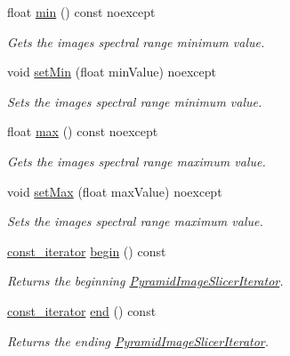 \begin{DoxyCompactItemize}
float \hyperlink{classdg_1_1deepcore_1_1imagery_1_1_pyramid_image_slicer_a80fbcced5b4df71aae2b04cc60373757}{min} () const noexcept
\begin{DoxyCompactList}\small\item\em Gets the image\textquotesingle{}s spectral range minimum value. \end{DoxyCompactList}\item 
void \hyperlink{classdg_1_1deepcore_1_1imagery_1_1_pyramid_image_slicer_a514054e5768ca0d3e034454c70a43849}{set\+Min} (float min\+Value) noexcept
\begin{DoxyCompactList}\small\item\em Sets the image\textquotesingle{}s spectral range minimum value. \end{DoxyCompactList}\item 
float \hyperlink{classdg_1_1deepcore_1_1imagery_1_1_pyramid_image_slicer_a7f180e86e5eb7c9c28a8a7e6531efd29}{max} () const noexcept
\begin{DoxyCompactList}\small\item\em Gets the image\textquotesingle{}s spectral range maximum value. \end{DoxyCompactList}\item 
void \hyperlink{classdg_1_1deepcore_1_1imagery_1_1_pyramid_image_slicer_aab02ead48c78b47f43dd00626e9d9d1f}{set\+Max} (float max\+Value) noexcept
\begin{DoxyCompactList}\small\item\em Sets the image\textquotesingle{}s spectral range maximum value. \end{DoxyCompactList}\item 
\hyperlink{classdg_1_1deepcore_1_1imagery_1_1_pyramid_image_slicer_ae7aff5a41f1137d54f566127aa2bb957}{const\+\_\+iterator} \hyperlink{group___imagery_module_gac100b1de973af8ac0c9a5e1c3dc8d755}{begin} () const 
\begin{DoxyCompactList}\small\item\em Returns the beginning \hyperlink{classdg_1_1deepcore_1_1imagery_1_1_pyramid_image_slicer_iterator}{Pyramid\+Image\+Slicer\+Iterator}. \end{DoxyCompactList}\item 
\hyperlink{classdg_1_1deepcore_1_1imagery_1_1_pyramid_image_slicer_ae7aff5a41f1137d54f566127aa2bb957}{const\+\_\+iterator} \hyperlink{group___imagery_module_ga6956abd01339df9e8c60963702ce3543}{end} () const 
\begin{DoxyCompactList}\small\item\em Returns the ending \hyperlink{classdg_1_1deepcore_1_1imagery_1_1_pyramid_image_slicer_iterator}{Pyramid\+Image\+Slicer\+Iterator}. \end{DoxyCompactList}\end{DoxyCompactItemize}


